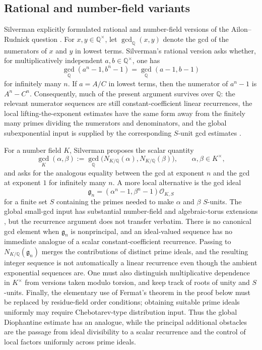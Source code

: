 \documentclass[11pt]{amsart}
\theoremstyle{remark}
\numberwithin{equation}{section}
\newcommand{\Q}{\mathbb Q}
\begin{document}
\subsection{Rational and number-field variants}\label{subsec:number-field}

Silverman explicitly formulated rational and number-field versions of the
Ailon--Rudnick question \cite{Sil20}.  For $x,y\in\Q^\times$, let
$\gcd_{\Q}(x,y)$ denote the gcd of the numerators of $x$ and $y$ in lowest terms.
Silverman's rational version asks whether, for multiplicatively independent
$a,b\in\Q^\times$, one has
\[
  \gcd_{\Q}(a^n-1,b^n-1)=\gcd_{\Q}(a-1,b-1)
\]
for infinitely many $n$.  If $a=A/C$ in lowest terms, then the numerator of
$a^n-1$ is $A^n-C^n$.  Consequently, much of the present argument survives over
$\Q$: the relevant numerator sequences are still constant-coefficient linear
recurrences, the local lifting-the-exponent estimates have the same form away from
the finitely many primes dividing the numerators and denominators, and the global
subexponential input is supplied by the corresponding $S$-unit gcd estimates
\cite{Lev19,GW20}.

For a number field $K$, Silverman proposes the scalar quantity
\[
  \gcd_K(\alpha,\beta)
  :=\gcd_{\Q}\bigl(N_{K/\Q}(\alpha),N_{K/\Q}(\beta)\bigr),
  \qquad \alpha,\beta\in K^\times,
\]
and asks for the analogous equality between the gcd at exponent $n$ and the gcd at
exponent $1$ for infinitely many $n$.  A more local alternative is the gcd ideal
\[
  \mathfrak g_n=(\alpha^n-1,\beta^n-1)\mathcal O_{K,S}
\]
for a finite set $S$ containing the primes needed to make $\alpha$ and $\beta$
$S$-units.  The global small-gcd input has substantial number-field and
algebraic-torus extensions \cite{Sil05,Lev19,GW20}, but the recurrence argument does
not transfer verbatim.  There is no canonical gcd element when $\mathfrak g_n$ is
nonprincipal, and an ideal-valued sequence has no immediate analogue of a scalar
constant-coefficient recurrence.  Passing to $N_{K/\Q}(\mathfrak g_n)$ merges the
contributions of distinct prime ideals, and the resulting integer sequence is not
automatically a linear recurrence even though the ambient exponential sequences
are.  One must also distinguish multiplicative dependence in $K^\times$ from
versions taken modulo torsion, and keep track of roots of unity and $S$-units.
Finally, the elementary use of Fermat's theorem in the proof below must be replaced
by residue-field order conditions; obtaining suitable prime ideals uniformly may
require Chebotarev-type distribution input.  Thus the global Diophantine estimate
has an analogue, while the principal additional obstacles are the passage from ideal
divisibility to a scalar recurrence and the control of local factors uniformly across
prime ideals.
\end{document}
